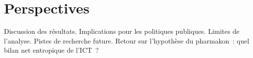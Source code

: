 \chapter{Perspectives}\label{ch:discussion}

Discussion des résultats. Implications pour les politiques publiques. Limites de l'analyse. Pistes de recherche future. Retour sur l'hypothèse du pharmakon~: quel bilan net entropique de l'ICT~?
